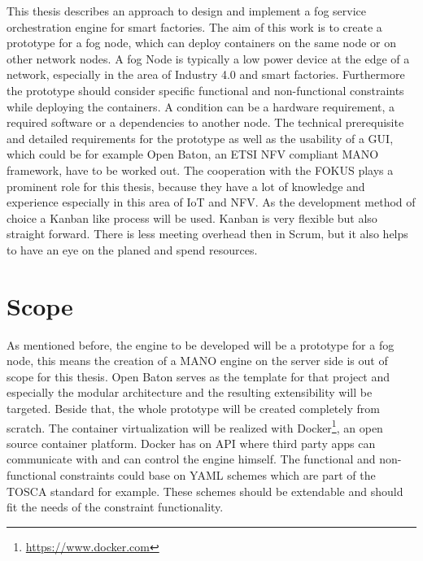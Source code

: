 This thesis describes an approach to design and implement a fog service orchestration engine for smart factories.
The aim of this work is to create a prototype for a fog node, which can deploy containers on the same node or on other network nodes.
A fog Node is typically a low power device at the edge of a network, especially in the area of Industry 4.0 and smart factories.
Furthermore the prototype should consider specific functional and non-functional constraints while deploying the containers.
A condition can be a hardware requirement, a required software or a dependencies to another node.
The technical prerequisite and detailed requirements for the prototype as well as the usability of a \ac{GUI}, which could be for example Open Baton, an \ac{ETSI} \ac{NFV} compliant \ac{MANO} framework, have to be worked out.
The cooperation with the \ac{FOKUS} plays a prominent role for this thesis, because they have a lot of knowledge and experience especially in this area of \ac{IoT} and \ac{NFV}.
As the development method of choice a Kanban like process will be used.
Kanban is very flexible but also straight forward.
There is less meeting overhead then in Scrum, but it also helps to have an eye on the planed and spend resources.


\section{Scope}


As mentioned before, the engine to be developed will be a prototype for a fog node, this means the creation of a \ac{MANO} engine on the server side is out of scope for this thesis.
Open Baton serves as the template for that project and especially the modular architecture and the resulting extensibility will be targeted.
Beside that, the whole prototype will be created completely from scratch.
The container virtualization will be realized with Docker\footnote{\url{https://www.docker.com}}, an open source container platform.
Docker has on \ac{API} where third party apps can communicate with and can control the engine himself.
The functional and non-functional constraints could base on \ac{YAML} schemes which are part of the \ac{TOSCA} standard for example.
These schemes should be extendable and should fit the needs of the constraint functionality.

